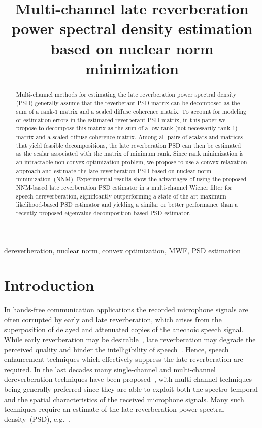\documentclass{article}
\title{Multi-channel late reverberation power spectral density estimation \\ based on nuclear norm minimization}
\def\ninept{\def\baselinestretch{.89}\let\normalsize\small\normalsize}
\begin{document}
\newlength\figureheight
\newlength\figurewidth
\setlength\figureheight{2.1cm}
\setlength{}
\ninept
\maketitle


\begin{abstract} 
  Multi-channel methods for estimating the late reverberation power spectral density (PSD) generally assume that the reverberant PSD matrix can be decomposed as the sum of a rank-$1$ matrix and a scaled diffuse coherence matrix.
  To account for modeling or estimation errors in the estimated reverberant PSD matrix, in this paper we propose to decompose this matrix as the sum of a low rank (not necessarily rank-$1$) matrix and a scaled diffuse coherence matrix.
  Among all pairs of scalars and matrices that yield feasible decompositions, the late reverberation PSD can then be estimated as the scalar associated with the matrix of minimum rank.
  Since rank minimization is an intractable non-convex optimization problem, we propose to use a convex relaxation approach and estimate the late reverberation PSD based on nuclear norm minimization~(NNM).
  Experimental results show the advantages of using the proposed NNM-based late reverberation PSD estimator in a multi-channel Wiener filter for speech dereverberation, significantly outperforming a state-of-the-art maximum likelihood-based PSD estimator and yielding a similar or better performance than a recently proposed eigenvalue decomposition-based PSD estimator. 
\end{abstract}

\begin{keywords}
dereverberation, nuclear norm, convex optimization, MWF, PSD estimation
\end{keywords}

\section{Introduction}
\label{sec:intro}
In hands-free communication applications the recorded microphone signals are often corrupted by early and late reverberation, which arises from the superposition of delayed and attenuated copies of the anechoic speech signal.
While early reverberation may be desirable~\cite{Bradley_JASA_2003}, late reverberation may degrade the perceived quality and hinder the intelligibility of speech~\cite{Warzybok_IWAENC_2014}.
Hence, speech enhancement techniques which effectively suppress the late reverberation are required.
In the last decades many single-channel and multi-channel dereverberation techniques have been proposed~\cite{Naylor_Derev_book}, with multi-channel techniques being generally preferred since they are able to exploit both the spectro-temporal and the spatial characteristics of the received microphone signals.
Many such techniques require an estimate of the late reverberation power spectral density~(PSD), e.g.~\cite{Habets_PhD,OSchwartz_ITASLP_2015,Cauchi_EURASIP_2015}.
\end{document}
